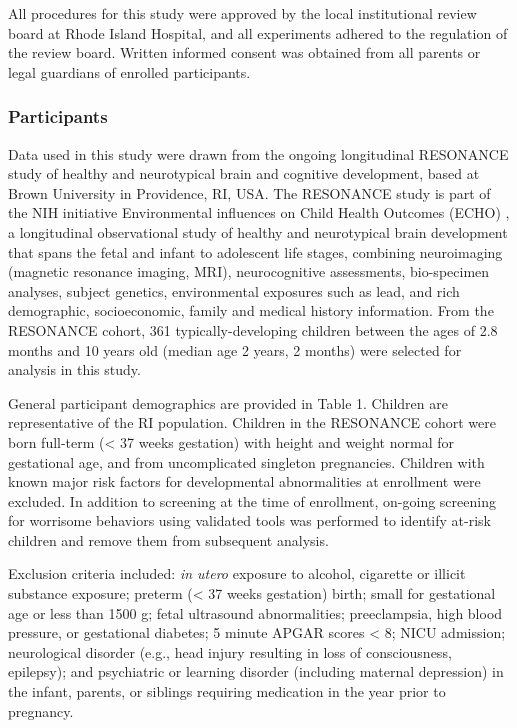 \documentclass{article}
\begin{document}
All procedures for this study were approved by the local institutional
review board at Rhode Island Hospital, and all experiments adhered to
the regulation of the review board. Written informed consent was
obtained from all parents or legal guardians of enrolled participants.

\subsubsection*{Participants}

Data used in this study were drawn from the ongoing longitudinal
RESONANCE study of healthy and neurotypical brain and cognitive
development, based at Brown University in Providence, RI, USA. The
RESONANCE study is part of the NIH initiative Environmental influences
on Child Health Outcomes (ECHO)
\cite{forrestAdvancingScienceChildren2018,gillmanEnvironmentalInfluencesChild2018},
 a longitudinal observational study of
healthy and neurotypical brain development that spans the fetal and
infant to adolescent life stages, combining neuroimaging (magnetic
resonance imaging, MRI), neurocognitive assessments, bio-specimen
analyses, subject genetics, environmental exposures such as lead, and
rich demographic, socioeconomic, family and medical history information.
From the RESONANCE cohort, 361 typically-developing children between the
ages of 2.8 months and 10 years old (median age 2 years, 2 months) were
selected for analysis in this study.

General participant demographics are provided in Table 1. Children are
representative of the RI population. Children in the RESONANCE cohort
were born full-term (\textless{} 37 weeks gestation) with height and
weight normal for gestational age, and from uncomplicated singleton
pregnancies. Children with known major risk factors for developmental
abnormalities at enrollment were excluded. In addition to screening at
the time of enrollment, on-going screening for worrisome behaviors using
validated tools was performed to identify at-risk children and remove
them from subsequent analysis.

Exclusion criteria included: \emph{in utero} exposure to alcohol,
cigarette or illicit substance exposure; preterm (\textless{} 37 weeks
gestation) birth; small for gestational age or less than 1500 g; fetal
ultrasound abnormalities; preeclampsia, high blood pressure, or
gestational diabetes; 5 minute APGAR scores \textless{} 8; NICU
admission; neurological disorder (e.g., head injury resulting in loss of
consciousness, epilepsy); and psychiatric or learning disorder
(including maternal depression) in the infant, parents, or siblings
requiring medication in the year prior to pregnancy.
\end{document}
